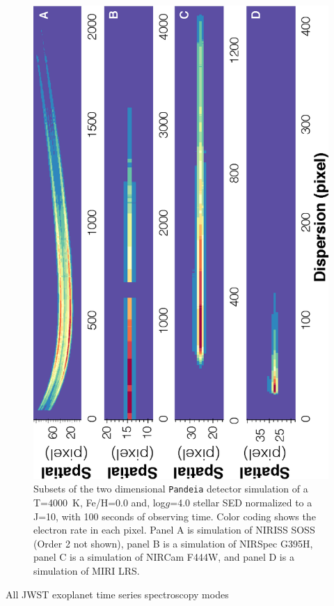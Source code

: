 \documentclass[iop]{emulateapj}
\begin{document}
\begin{figure}[ht]
 \includegraphics[angle=270,origin=c,width=\linewidth]{fig2.eps}
\caption{Subsets of the two dimensional \texttt{Pandeia} detector simulation of a T=4000~K, Fe/H=0.0 and, log$g$=4.0 stellar SED normalized to a J=10, with 100 seconds of observing time. Color coding shows the electron rate in each pixel. Panel A is simulation of NIRISS SOSS (Order 2 not shown), panel B is a simulation of NIRSpec G395H, panel C is a simulation of NIRCam F444W, and panel D is a simulation of MIRI LRS. \label{fig2}}
\end{figure}
All JWST exoplanet time series spectroscopy modes
\end{document}
